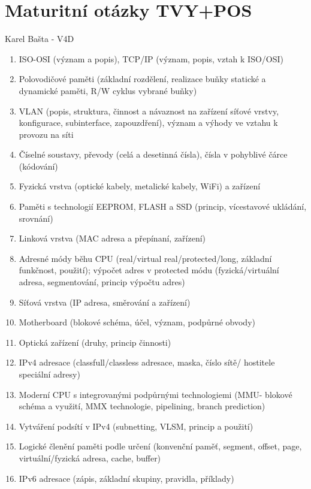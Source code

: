 \documentclass[a4paper,11pt]{article}
\begin{document}

\section*{Maturitní otázky TVY+POS}
\begin{center}
    \Large Karel Bašta - V4D
\end{center}
\begin{enumerate}
    \item ISO-OSI (význam a popis), TCP/IP (význam, popis, vztah k ISO/OSI)
    \item Polovodičové paměti (základní rozdělení, realizace buňky statické a dynamické paměti, R/W cyklus vybrané buňky)
    \item VLAN (popis, struktura, činnost a návaznost na zařízení síťové vrstvy, konfigurace, subinterface, zapouzdření), význam a výhody ve vztahu k provozu na síti
    \item Číselné soustavy, převody (celá a desetinná čísla), čísla v pohyblivé čárce (kódování)
    \item Fyzická vrstva (optické kabely, metalické kabely, WiFi) a zařízení
    \item Paměti s technologií EEPROM, FLASH a SSD (princip, vícestavové ukládání, srovnání)
    \item Linková vrstva (MAC adresa a přepínaní, zařízení)
    \item Adresné módy běhu CPU (real/virtual real/protected/long, základní funkčnost, použití); výpočet adres v protected módu (fyzická/virtuální adresa, segmentování, princip výpočtu adres)
    \item Síťová vrstva (IP adresa, směrování a zařízení)
    \item Motherboard (blokové schéma, účel, význam, podpůrné obvody)
    \item Optická zařízení (druhy, princip činnosti)
    \item IPv4 adresace (classfull/classless adresace, maska, číslo sítě/ hostitele speciální adresy)
    \item Moderní CPU s integrovanými podpůrnými technologiemi (MMU- blokové schéma a využití, MMX technologie, pipelining, branch prediction)
    \item Vytváření podsítí v IPv4 (subnetting, VLSM, princip a použití)
    \item Logické členění paměti podle určení (konvenční paměť, segment, offset, page, virtuální/fyzická adresa, cache, buffer)
    \item IPv6 adresace (zápis, základní skupiny, pravidla, příklady)

\end{enumerate}
\end{document}
